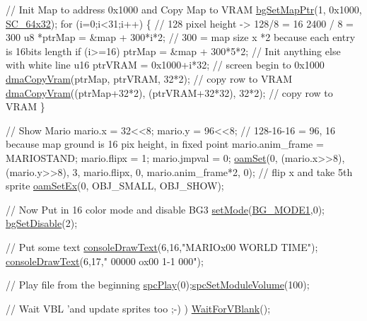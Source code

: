 \begin{DoxyCodeInclude}
    \textcolor{comment}{// Init Map to address 0x1000 and Copy Map to VRAM}
    \hyperlink{a00347_a4fcbdb4b2378a64e8db62a184ee1851e}{bgSetMapPtr}(1, 0x1000, \hyperlink{a00347_a6129b86a7c2913a31f1bca293fa7c1e7}{SC\_64x32});
    \textcolor{keywordflow}{for} (i=0;i<31;i++) \{ \textcolor{comment}{// 128 pixel height -> 128/8 = 16 2400 / 8 = 300}
        u8 *ptrMap  = &map + 300*i*2; \textcolor{comment}{// 300 = map size x *2 because each entry is 16bits length}
        \textcolor{keywordflow}{if} (i>=16) ptrMap  = &map + 300*5*2; \textcolor{comment}{// Init anything else with white line}
        u16 ptrVRAM = 0x1000+i*32; \textcolor{comment}{// screen begin to 0x1000}
        \hyperlink{a00353_aaf545b3f811f6ef4b7c4be434701a77a}{dmaCopyVram}(ptrMap, ptrVRAM, 32*2); \textcolor{comment}{// copy row to VRAM }
        \hyperlink{a00353_aaf545b3f811f6ef4b7c4be434701a77a}{dmaCopyVram}((ptrMap+32*2), (ptrVRAM+32*32), 32*2); \textcolor{comment}{// copy row to VRAM }
    \}

    \textcolor{comment}{// Show Mario}
    mario.x = 32<<8; mario.y = 96<<8; \textcolor{comment}{// 128-16-16 = 96, 16 because map ground is 16 pix height, in fixed
       point}
    mario.anim\_frame = MARIOSTAND; mario.flipx = 1; mario.jmpval = 0;
    \hyperlink{a00380_a2f62a591672b786d90ebb03fdf25f159}{oamSet}(0,  (mario.x>>8), (mario.y>>8), 3, mario.flipx, 0, mario.anim\_frame*2, 0);  \textcolor{comment}{// flip x and
       take 5th sprite}
    \hyperlink{a00380_a4120a8ff32c39973babeca3615a0a2fd}{oamSetEx}(0, OBJ\_SMALL, OBJ\_SHOW);
    
    \textcolor{comment}{// Now Put in 16 color mode and disable BG3}
    \hyperlink{a00383_afd9e46ae627d055dd8c98a4b0ebb73b1}{setMode}(\hyperlink{a00347_a05c862edb7f8f75036f10c04dcc3c2a6}{BG\_MODE1},0);  \hyperlink{a00347_a4dbfb1b8854ff9ca4a7d11a899281bbb}{bgSetDisable}(2);
    
    \textcolor{comment}{// Put some text}
    \hyperlink{a00350_a7e52d15b5a1befa42f5758de19dfb70c}{consoleDrawText}(6,16,\textcolor{stringliteral}{"MARIOx00  WORLD TIME"});
    \hyperlink{a00350_a7e52d15b5a1befa42f5758de19dfb70c}{consoleDrawText}(6,17,\textcolor{stringliteral}{" 00000 ox00 1-1  000"});
    
    \textcolor{comment}{// Play file from the beginning}
    \hyperlink{a00377_aebf91de1df5e4fa83454a84bb0e60918}{spcPlay}(0);\hyperlink{a00377_ae2c8dfab62ceecf5c302c95f5453a752}{spcSetModuleVolume}(100);
    
    \textcolor{comment}{// Wait VBL 'and update sprites too ;-) )}
    \hyperlink{a00356_a815e2626bd26d0e936d507a363ecd723}{WaitForVBlank}();
    

\end{DoxyCodeInclude}
